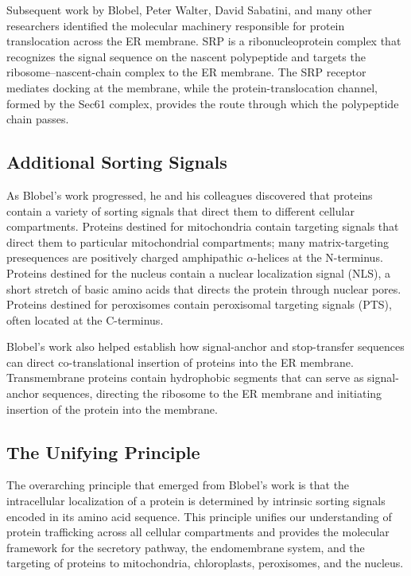 Subsequent work by Blobel, Peter Walter, David Sabatini, and many other researchers identified the molecular machinery responsible for protein translocation across the ER membrane. SRP is a ribonucleoprotein complex that recognizes the signal sequence on the nascent polypeptide and targets the ribosome--nascent-chain complex to the ER membrane. The SRP receptor mediates docking at the membrane, while the protein-translocation channel, formed by the Sec61 complex, provides the route through which the polypeptide chain passes.

\subsection{Additional Sorting Signals}

As Blobel's work progressed, he and his colleagues discovered that proteins contain a variety of sorting signals that direct them to different cellular compartments. Proteins destined for mitochondria contain targeting signals that direct them to particular mitochondrial compartments; many matrix-targeting presequences are positively charged amphipathic $\alpha$-helices at the N-terminus. Proteins destined for the nucleus contain a nuclear localization signal (NLS), a short stretch of basic amino acids that directs the protein through nuclear pores. Proteins destined for peroxisomes contain peroxisomal targeting signals (PTS), often located at the C-terminus.

Blobel's work also helped establish how signal-anchor and stop-transfer sequences can direct co-translational insertion of proteins into the ER membrane. Transmembrane proteins contain hydrophobic segments that can serve as signal-anchor sequences, directing the ribosome to the ER membrane and initiating insertion of the protein into the membrane.

\subsection{The Unifying Principle}

The overarching principle that emerged from Blobel's work is that the intracellular localization of a protein is determined by intrinsic sorting signals encoded in its amino acid sequence. This principle unifies our understanding of protein trafficking across all cellular compartments and provides the molecular framework for the secretory pathway, the endomembrane system, and the targeting of proteins to mitochondria, chloroplasts, peroxisomes, and the nucleus.

